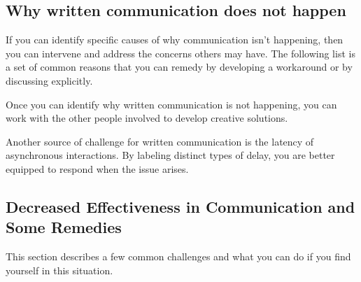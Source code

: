 \subsection*{Why written communication does not happen\label{sec:written-comm-does-not-happen}}
If you can identify specific causes of why communication isn't happening, then you can intervene and address the concerns others may have. The following list is a set of common reasons that you can remedy by developing a workaround or by discussing explicitly. 
Once you can identify why written communication is not happening, you can work with the other people involved to develop creative solutions. 

Another source of challenge for written communication is the latency of asynchronous interactions. By labeling distinct types of delay, you are better equipped to respond when the issue arises. 



\subsection*{Decreased Effectiveness in Communication and Some Remedies}

This section describes a few common challenges and what you can do if you find yourself in this situation.

